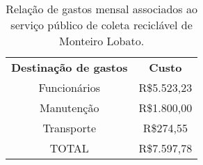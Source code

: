 \begin{table}[htbp]
  \centering
  \caption{Relação de gastos mensal associados ao serviço público de coleta reciclável de Monteiro Lobato.}
    \begin{tabular}{c|c}
    \rowcolor[rgb]{ .969,  .588,  .275} \textcolor[rgb]{ 1,  1,  1}{\textbf{Destinação de gastos}} & \textcolor[rgb]{ 1,  1,  1}{\textbf{Custo}} \\
    \rowcolor[rgb]{ .992,  .914,  .851} Funcionários & R\$5.523,23 \\
    \rowcolor[rgb]{ .984,  .831,  .706} Manutenção & R\$1.800,00 \\
    \rowcolor[rgb]{ .992,  .914,  .851} Transporte & R\$274,55 \\
    \rowcolor[rgb]{ .984,  .831,  .706} TOTAL & R\$7.597,78 \\
    \end{tabular}%
  \label{tab:gasto_reciclavel}%
\end{table}%
